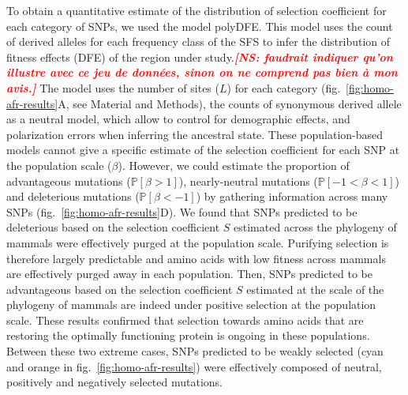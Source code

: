 \documentclass{article}
\newcommand{\NS}[1]{\textcolor{red}{\textbf{\emph{[NS: #1]}}}}
\newcommand{\proba}{\mathbb{P}}
\newcommand{\Sphy}{S}
\newcommand{\Spop}{\beta}
\newcommand{\polyDel}{\Spop < -1}
\newcommand{\polyNeutral}{-1 < \Spop < 1}
\newcommand{\polyAdv}{ \Spop > 1}
\newcommand{\PpolyDel}{\proba \left[ \polyDel \right]}
\newcommand{\PpolyNeutral}{\proba \left[ \polyNeutral \right]}
\newcommand{\PpolyAdv}{\proba \left[ \polyAdv \right]}
\begin{document}
    To obtain a quantitative estimate of the distribution of selection coefficient for each category of SNPs, we used the model polyDFE\cite{tataru_inference_2017, tataru_polydfe_2020}.
    This model uses the count of derived alleles for each frequency class of the SFS to infer the distribution of fitness effects (DFE) of the region under study.\NS{faudrait indiquer qu'on illustre avec ce jeu de données, sinon on ne comprend pas bien à mon avis.}
    The model uses the number of sites ($L$) for each category (fig.~\ref{fig:homo-afr-results}A, see Material and Methods), the counts of synonymous derived allele as a neutral model, which allow to control for demographic effects, and polarization errors when inferring the ancestral state.
    These population-based models cannot give a specific estimate of the selection coefficient for each SNP at the population scale ($\Spop$).
    However, we could estimate the proportion of advantageous mutations ($\PpolyAdv$), nearly-neutral mutations ($\PpolyNeutral$) and deleterious mutations ($\PpolyDel$) by gathering information across many SNPs (fig.~\ref{fig:homo-afr-results}D).
    We found that SNPs predicted to be deleterious based on the selection coefficient $\Sphy$ estimated across the phylogeny of mammals were effectively purged at the population scale.
    Purifying selection is therefore largely predictable and amino acids with low fitness across mammals are effectively purged away in each population.
    Then, SNPs predicted to be advantageous based on the selection coefficient $\Sphy$ estimated at the scale of the phylogeny of mammals are indeed under positive selection at the population scale.
    These results confirmed that selection towards amino acids that are restoring the optimally functioning protein is ongoing in these populations.
    Between these two extreme cases, SNPs predicted to be weakly selected (cyan and orange in fig.~\ref{fig:homo-afr-results}) were effectively composed of neutral, positively and negatively selected mutations.
\end{document}
